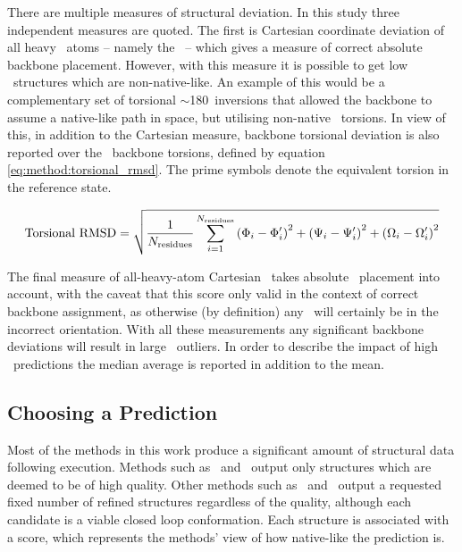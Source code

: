 There are multiple measures of structural deviation. In this study three independent measures are quoted. The first is Cartesian coordinate deviation of all heavy \mainchain\ atoms -- namely the \bbatoms\ -- which gives a measure of correct absolute backbone placement. However, with this measure it is possible to get low \crms\ structures which are non-native-like. An example of this would be a complementary set of torsional $\sim$180\degree\ inversions that allowed the backbone to assume a native-like path in space, but utilising non-native  \mainchain\ torsions. In view of this, in addition to the Cartesian measure, backbone torsional deviation is also reported over the \phipsiomg\ backbone torsions, defined by equation \ref{eq:method:torsional_rmsd}.
The prime symbols denote the equivalent torsion in the reference state.

\begin{equation}
\mathrm{Torsional~RMSD}=\sqrt{\frac{1}{N_\mathrm{residues}}\displaystyle\sum_{i=1}^{N_\mathrm{residues}}
\left( \Phi_i-\Phi'_i  \right)^2
+ \left( \Psi_i-\Psi'_i \right)^2 
+ \left( \Omega_i-\Omega'_i \right)^2   
}
\label{eq:method:torsional_rmsd}
\end{equation}

The final measure of all-heavy-atom Cartesian \crms\ takes absolute \sidechain\ placement into account, with the caveat that this score only valid in the context of correct backbone assignment, as otherwise (by definition) any \sidechains\ will certainly be in the incorrect orientation.
With all these measurements any  significant backbone deviations will result
in
 large \crms\ outliers. In order to describe the impact of high \crms\  predictions the median
average is reported in addition to the mean.



\subsection{Choosing a Prediction}

Most of the methods in this work produce a significant amount of structural
data following execution. Methods such as \plop\ and \rapper\ output only
structures which are deemed to be of high quality. Other methods such as
\cloop\ and \modloop\ output a requested fixed number of refined structures regardless
of the quality, although each candidate is a viable closed loop conformation. Each structure is associated with a score, which
represents the methods' view of how native-like the prediction is.  

